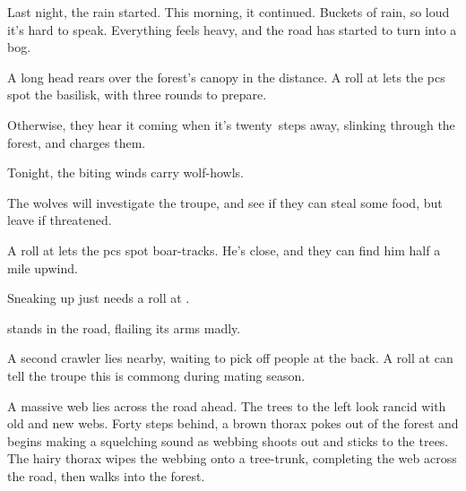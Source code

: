 \ifcase\value{cycle}


\begin{boxtext}
  Last night, the rain started.
  This morning, it continued.
  Buckets of rain, so loud it's hard to speak.
  Everything feels heavy, and the road has started to turn into a bog.
\end{boxtext}

A long head rears over the forest's canopy in the distance.
A  roll at \tn[10] lets the \glspl{pc} spot the \gls{basilisk}, with three \glspl{round} to prepare.

Otherwise, they hear it coming when it's twenty~\glspl{step} away, slinking through the forest, and charges them.

\basilisk

\or%

\begin{boxtext}
  Tonight, the biting winds carry wolf-howls.
\end{boxtext}

The wolves will investigate the troupe, and see if they can steal some food, but leave if threatened.

\wolf

\or%

A  roll at \tn[10] lets the \glspl{pc} spot boar-tracks.
He's close, and they can find him half a mile upwind.

\boar

Sneaking up just needs a  roll at
\tn.

\or%

\begin{boxtext}
   stands in the road, flailing its arms madly.
\end{boxtext}

A second \gls{crawler} lies nearby, waiting to pick off people at the back.
A  roll at \tn[10] can tell the troupe this is commong during mating season.

\chitincrawler
\label{crawlerStatblock}

\chitincrawler

\or%

\begin{boxtext}
  A massive web lies across the road ahead.
  The trees to the left look rancid with old and new webs.
  Forty \glspl{step} behind, a brown thorax pokes out of the forest and begins making a squelching sound as webbing shoots out and sticks to the trees.
  The hairy thorax wipes the webbing onto a tree-trunk, completing the web across the road, then walks into the forest.
\end{boxtext}

